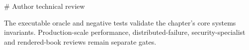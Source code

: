 # Author technical review

The executable oracle and negative tests validate the chapter's core systems invariants. Production-scale performance, distributed-failure, security-specialist and rendered-book reviews remain separate gates.

